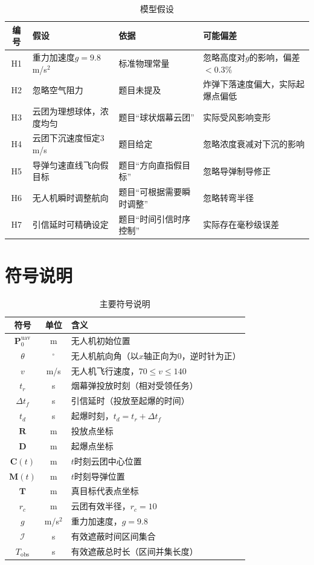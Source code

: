 \documentclass[a4paper]{ctexart}
\newcommand{\bm}[1]{\boldsymbol{#1}}
\begin{document}
\begin{table}[H]
\centering
{}
\caption{模型假设}
\label{tab:assumptions}
\begin{tabular}{c|p{4cm}|p{3cm}|p{4cm}}
\toprule
编号 & 假设 & 依据 & 可能偏差 \\
\midrule
H1 & 重力加速度$g=9.8$\,m/s$^2$ & 标准物理常量 & 忽略高度对$g$的影响，偏差$<0.3\%$ \\
H2 & 忽略空气阻力 & 题目未提及 & 炸弹下落速度偏大，实际起爆点偏低 \\
H3 & 云团为理想球体，浓度均匀 & 题目``球状烟幕云团'' & 实际受风影响变形 \\
H4 & 云团下沉速度恒定3\,m/s & 题目给定 & 忽略浓度衰减对下沉的影响 \\
H5 & 导弹匀速直线飞向假目标 & 题目``方向直指假目标'' & 忽略导弹制导修正 \\
H6 & 无人机瞬时调整航向 & 题目``可根据需要瞬时调整'' & 忽略转弯半径 \\
H7 & 引信延时可精确设定 & 题目``时间引信时序控制'' & 实际存在毫秒级误差 \\
\bottomrule
\end{tabular}
\end{table}

\section{符号说明}

\begin{table}[H]
\centering
{}
\caption{主要符号说明}
\label{tab:symbols}
\begin{tabular}{c|c|p{6cm}}
\toprule
符号 & 单位 & 含义 \\
\midrule
$\bm{P}_0^{\text{uav}}$ & m & 无人机初始位置 \\
$\theta$ & $^\circ$ & 无人机航向角（以$x$轴正向为0，逆时针为正） \\
$v$ & m/s & 无人机飞行速度，$70\leq v\leq 140$ \\
$t_r$ & s & 烟幕弹投放时刻（相对受领任务） \\
$\Delta t_f$ & s & 引信延时（投放至起爆的时间） \\
$t_d$ & s & 起爆时刻，$t_d=t_r+\Delta t_f$ \\
$\bm{R}$ & m & 投放点坐标 \\
$\bm{D}$ & m & 起爆点坐标 \\
$\bm{C}(t)$ & m & $t$时刻云团中心位置 \\
$\bm{M}(t)$ & m & $t$时刻导弹位置 \\
$\bm{T}$ & m & 真目标代表点坐标 \\
$r_c$ & m & 云团有效半径，$r_c=10$ \\
$g$ & m/s$^2$ & 重力加速度，$g=9.8$ \\
$\mathcal{I}$ & s & 有效遮蔽时间区间集合 \\
$T_{\text{obs}}$ & s & 有效遮蔽总时长（区间并集长度） \\
\bottomrule
\end{tabular}
\end{table}
\end{document}
